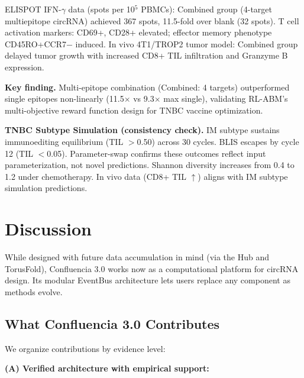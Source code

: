 \documentclass[11pt,a4paper]{article}
\begin{document}
ELISPOT IFN-$\gamma$ data (spots per 10$^5$ PBMCs): Combined group (4-target multiepitope circRNA) achieved 367 spots, 11.5-fold over blank (32 spots). T cell activation markers: CD69+, CD28+ elevated; effector memory phenotype CD45RO+CCR7$-$ induced. In vivo 4T1/TROP2 tumor model: Combined group delayed tumor growth with increased CD8+ TIL infiltration and Granzyme B expression.

\textbf{Key finding.} Multi-epitope combination (Combined: 4 targets) outperformed single epitopes non-linearly (11.5$\times$ vs 9.3$\times$ max single), validating RL-ABM's multi-objective reward function design for TNBC vaccine optimization.

\textbf{TNBC Subtype Simulation (consistency check).} IM subtype sustains immunoediting equilibrium (TIL $>$0.50) across 30 cycles. BLIS escapes by cycle 12 (TIL $<$0.05). Parameter-swap confirms these outcomes reflect input parameterization, not novel predictions. Shannon diversity increases from 0.4 to 1.2 under chemotherapy. In vivo data (CD8+ TIL $\uparrow$) aligns with IM subtype simulation predictions.

\section{Discussion}

While designed with future data accumulation in mind (via the Hub and TorusFold), Confluencia 3.0 works now as a computational platform for circRNA design. Its modular EventBus architecture lets users replace any component as methods evolve.

\subsection{What Confluencia 3.0 Contributes}

We organize contributions by evidence level:

\textbf{(A) Verified architecture with empirical support:}
\end{document}
